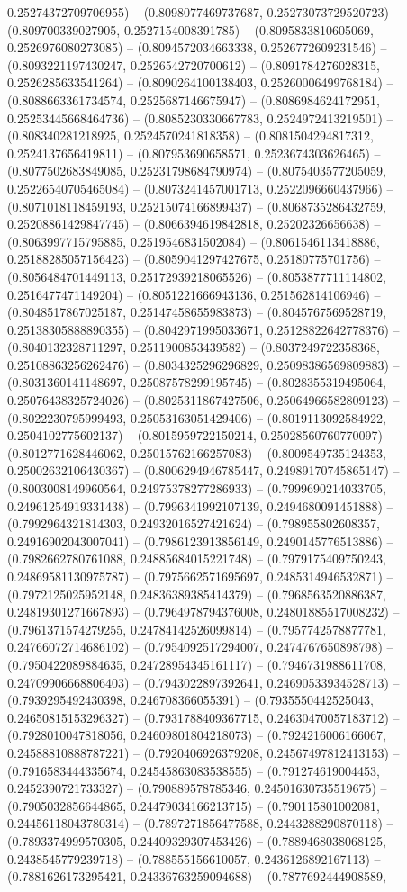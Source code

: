 0.25274372709706955) -- (0.8098077469737687, 0.25273073729520723) -- (0.809700339027905, 0.2527154008391785) -- (0.8095833810605069, 0.2526976080273085) -- (0.8094572034663338, 0.2526772609231546) -- (0.8093221197430247, 0.2526542720700612) -- (0.8091784276028315, 0.2526285633541264) -- (0.8090264100138403, 0.25260006499768184) -- (0.8088663361734574, 0.2525687146675947) -- (0.8086984624172951, 0.25253445668464736) -- (0.8085230330667783, 0.2524972413219501) -- (0.808340281218925, 0.2524570241818358) -- (0.8081504294817312, 0.2524137656419811) -- (0.807953690658571, 0.2523674303626465) -- (0.8077502683849085, 0.25231798684790974) -- (0.8075403577205059, 0.25226540705465084) -- (0.8073241457001713, 0.2522096660437966) -- (0.8071018118459193, 0.25215074166899437) -- (0.8068735286432759, 0.25208861429847745) -- (0.8066394619842818, 0.25202326656638) -- (0.8063997715795885, 0.2519546831502084) -- (0.8061546113418886, 0.25188285057156423) -- (0.8059041297427675, 0.25180775701756) -- (0.8056484701449113, 0.25172939218065526) -- (0.8053877711114802, 0.2516477471149204) -- (0.8051221666943136, 0.251562814106946) -- (0.8048517867025187, 0.25147458655983873) -- (0.8045767569528719, 0.25138305888890355) -- (0.8042971995033671, 0.25128822642778376) -- (0.8040132328711297, 0.2511900853439582) -- (0.8037249722358368, 0.25108863256262476) -- (0.8034325296296829, 0.25098386569809883) -- (0.8031360141148697, 0.25087578299195745) -- (0.8028355319495064, 0.25076438325724026) -- (0.8025311867427506, 0.25064966582809123) -- (0.8022230795999493, 0.25053163051429406) -- (0.8019113092584922, 0.2504102775602137) -- (0.8015959722150214, 0.25028560760770097) -- (0.8012771628446062, 0.25015762166257083) -- (0.8009549735124353, 0.25002632106430367) -- (0.8006294946785447, 0.24989170745865147) -- (0.8003008149960564, 0.24975378277286933) -- (0.7999690214033705, 0.24961254919331438) -- (0.7996341992107139, 0.2494680091451888) -- (0.7992964321814303, 0.24932016527421624) -- (0.798955802608357, 0.24916902043007041) -- (0.7986123913856149, 0.2490145776513886) -- (0.7982662780761088, 0.24885684015221748) -- (0.7979175409750243, 0.24869581130975787) -- (0.7975662571695697, 0.2485314946532871) -- (0.7972125025952148, 0.24836389385414379) -- (0.7968563520886387, 0.24819301271667893) -- (0.7964978794376008, 0.24801885517008232) -- (0.7961371574279255, 0.24784142526099814) -- (0.7957742578877781, 0.24766072714686102) -- (0.7954092517294007, 0.2474767650898798) -- (0.7950422089884635, 0.24728954345161117) -- (0.7946731988611708, 0.24709906668806403) -- (0.7943022897392641, 0.24690533934528713) -- (0.7939295492430398, 0.246708366055391) -- (0.7935550442525043, 0.24650815153296327) -- (0.7931788409367715, 0.24630470057183712) -- (0.7928010047818056, 0.24609801804218073) -- (0.7924216006166067, 0.24588810888787221) -- (0.7920406926379208, 0.24567497812413153) -- (0.7916583444335674, 0.24545863083538555) -- (0.791274619004453, 0.2452390721733327) -- (0.790889578785346, 0.24501630735519675) -- (0.7905032856644865, 0.24479034166213715) -- (0.790115801002081, 0.24456118043780314) -- (0.7897271856477588, 0.2443288290870118) -- (0.7893374999570305, 0.24409329307453426) -- (0.7889468038068125, 0.2438545779239718) -- (0.788555156610057, 0.2436126892167113) -- (0.7881626173295421, 0.24336763259094688) -- (0.7877692444908589, 